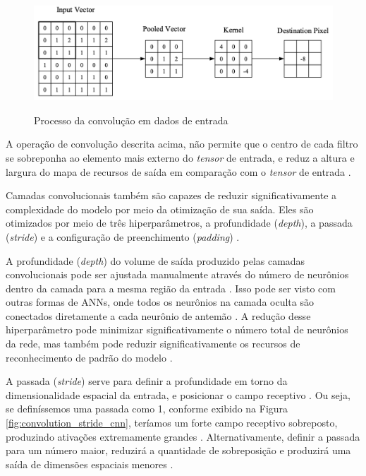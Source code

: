 \documentclass[
	12pt,				%
	oneside,			%
	a4paper,			%
	english,			%
	brazil				%
	]{abntex2ppgsi}
\begin{document}
\begin{figure}[H]
    \centering
    \caption{Processo da convolução em dados de entrada}
    \includegraphics[scale=.35]{imagens/conceitos_basicos/convolution_cnn.png}
    \label{fig:convolution_cnn}
\end{figure}

A operação de convolução descrita acima, não permite que o centro de cada filtro se sobreponha ao elemento mais externo do \textit{tensor} de entrada, e reduz a altura e largura do mapa de recursos de saída em comparação com o \textit{tensor} de entrada \cite{yamashita2018convolutional}.

Camadas convolucionais também são capazes de reduzir significativamente a complexidade do modelo por meio da otimização de sua saída. Eles são otimizados por meio de três hiperparâmetros, a profundidade (\textit{depth}), a passada (\textit{stride}) e a configuração de preenchimento (\textit{padding}) \cite{o2015introduction}. 

A profundidade (\textit{depth}) do volume de saída produzido pelas camadas convolucionais pode ser ajustada manualmente através do número de neurônios dentro da camada para a mesma região da entrada \cite{o2015introduction}. Isso pode ser visto com outras formas de ANNs, onde todos os neurônios na camada oculta são conectados diretamente a cada neurônio de antemão \cite{o2015introduction}. A redução desse hiperparâmetro pode minimizar significativamente o número total de neurônios da rede, mas também pode reduzir significativamente os recursos de reconhecimento de padrão do modelo \cite{o2015introduction}.

A passada (\textit{stride}) serve para definir a profundidade em torno da dimensionalidade espacial da entrada, e posicionar o campo receptivo \cite{o2015introduction}. Ou seja, se definíssemos uma passada como 1, conforme exibido na Figura \ref{fig:convolution_stride_cnn}, teríamos um forte campo receptivo sobreposto, produzindo ativações extremamente grandes \cite{o2015introduction}. Alternativamente, definir a passada para um número maior, reduzirá a quantidade de sobreposição e produzirá uma saída de dimensões espaciais menores \cite{o2015introduction}.
\end{document}
